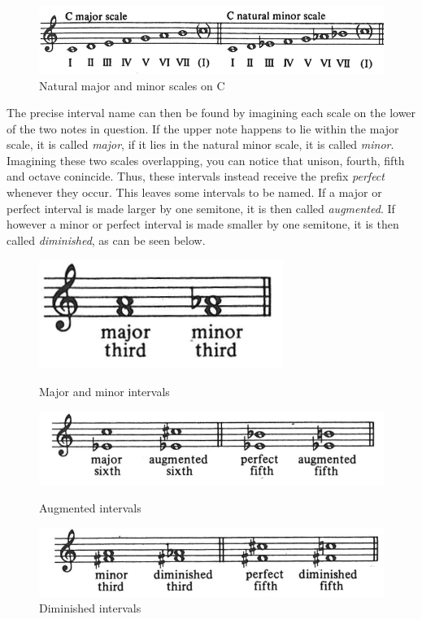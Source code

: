 \documentclass[a4paper,12pt]{report}
\begin{document}
\begin{figure}[h]
\centering
\includegraphics[scale=0.35]{Piston_2.jpg}
\caption{Natural major and minor scales on C}
\end{figure}

The precise interval name can then be found by imagining each scale on the lower of the two notes in question. If the upper note happens to lie within the major scale, it is called \textit{major}, if it lies in the natural minor scale, it is called \textit{minor}. Imagining these two scales overlapping, you can notice that unison, fourth, fifth and octave conincide. Thus, these intervals instead receive the prefix \textit{perfect} whenever they occur. This leaves some intervals to be named. If a major or perfect interval is made larger by one semitone, it is then called \textit{augmented}. If however a minor or perfect interval is made smaller by one semitone, it is then called \textit{diminished}, as can be seen below.

\begin{figure}[h]
\centering
\includegraphics[scale=0.45]{Piston_3.jpg}
\caption{Major and minor intervals}

\includegraphics[scale=0.4]{Piston_4.jpg}
\caption{Augmented intervals}


\includegraphics[scale=0.4]{Piston_5.jpg}
\caption{Diminished intervals}
\end{figure}
\end{document}
